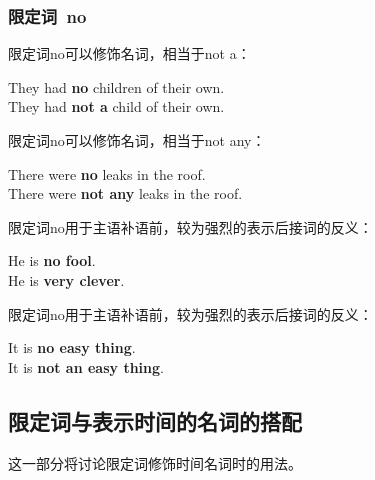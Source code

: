 \documentclass[UTF8]{ctexart}
\newcommand{\littf}[1]{{\hspace{3pt}\ttfamily #1}}
\begin{document}
\newpage

\subsubsection{限定词~\littf{no}}
    限定词\littf{no}可以修饰名词，相当于\littf{not a}：
    \begin{center}
        \large\ttfamily
        They had \textbf{no} children of their own.\\[3mm]
        They had \textbf{not a} child of their own.\\[6mm]
    \end{center}
    限定词\littf{no}可以修饰名词，相当于\littf{not any}：
    \begin{center}
        \large\ttfamily
        There were \textbf{no} leaks in the roof.\\[3mm]
        There were \textbf{not any} leaks in the roof.\\[6mm]
    \end{center}
    限定词\littf{no}用于主语补语前，较为强烈的表示后接词的反义：
    \begin{center}
        \large\ttfamily
        He is \textbf{no fool}.\\[3mm]
        He is \textbf{very clever}.\\[6mm]
    \end{center}
    限定词\littf{no}用于主语补语前，较为强烈的表示后接词的反义：
    \begin{center}
        \large\ttfamily
        It is \textbf{no easy thing}.\\[3mm]
        It is \textbf{not an easy thing}.
    \end{center}

\newpage

\subsection{限定词与表示时间的名词的搭配}
    这一部分将讨论限定词修饰时间名词时的用法。
\end{document}
